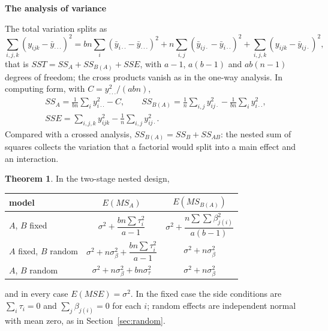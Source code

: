 \documentclass[11pt,a4paper]{article}
\numberwithin{equation}{section}
\theoremstyle{definition}
\newtheorem{thm}{Theorem}[subsection]
\newcommand{\subhead}[1]{%
  \par\medskip\noindent\textbf{#1}\par\nobreak\smallskip}
\begin{document}
\subhead{The analysis of variance}
The total variation splits as
\[
\sum_{i,j,k}(y_{ijk} - \bar y_{\cdot\cdot\cdot})^2 = bn\sum_i(\bar y_{i\cdot\cdot} - \bar y_{\cdot\cdot\cdot})^2 + n\sum_{i,j}(\bar y_{ij\cdot} - \bar y_{i\cdot\cdot})^2 + \sum_{i,j,k}(y_{ijk} - \bar y_{ij\cdot})^2 ,
\]
that is $SST = SS_A + SS_{B(A)} + SSE$, with $a - 1$, $a(b - 1)$ and $ab(n - 1)$ degrees of freedom; the cross products vanish as in the one-way analysis. In computing
form, with $C = y_{\cdot\cdot\cdot}^2/(abn)$,
\begin{gather*}
SS_A = \frac1{bn}\sum_iy_{i\cdot\cdot}^2 - C , \qquad SS_{B(A)} = \frac1n\sum_{i,j}y_{ij\cdot}^2 - \frac1{bn}\sum_iy_{i\cdot\cdot}^2 , \\
SSE = \sum_{i,j,k}y_{ijk}^2 - \frac1n\sum_{i,j}y_{ij\cdot}^2 .
\end{gather*}
Compared with a crossed analysis, $SS_{B(A)} = SS_B + SS_{AB}$: the nested sum of squares collects the variation that a factorial would split into a main
effect and an interaction.

\begin{thm}\label{thm:nested-ems}
In the two-stage nested design,
\begin{center}
\begin{tabular}{l|cc}
model & $E(MS_A)$ & $E(MS_{B(A)})$ \\
\hline
$A$, $B$ fixed & $\sigma^2 + \dfrac{bn\sum\tau_i^2}{a - 1}$ & $\sigma^2 + \dfrac{n\sum\sum\beta_{j(i)}^2}{a(b - 1)}$ \\[2ex]
$A$ fixed, $B$ random & $\sigma^2 + n\sigma^2_\beta + \dfrac{bn\sum\tau_i^2}{a - 1}$ & $\sigma^2 + n\sigma^2_\beta$ \\[2ex]
$A$, $B$ random & $\sigma^2 + n\sigma^2_\beta + bn\sigma^2_\tau$ & $\sigma^2 + n\sigma^2_\beta$
\end{tabular}
\end{center}
and in every case $E(MSE) = \sigma^2$.
In the fixed case the side conditions are $\sum_i\tau_i = 0$ and $\sum_j\beta_{j(i)} = 0$ for each $i$; random effects are independent normal with mean zero, as in
Section~\ref{sec:random}.
\end{thm}
\end{document}
